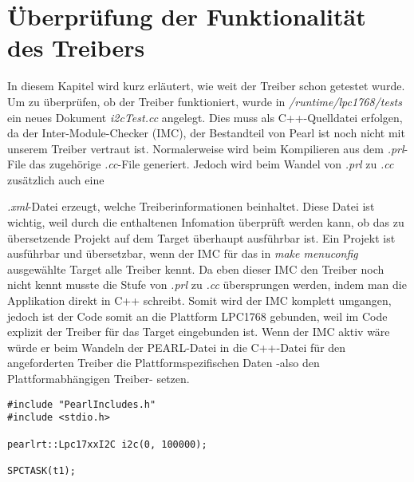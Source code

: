 \section{Überprüfung der Funktionalität des Treibers}
In diesem Kapitel wird kurz erläutert, wie weit der Treiber schon getestet wurde.
Um zu überprüfen, ob der Treiber funktioniert, wurde in {\textit{/runtime/lpc1768/tests}} ein neues Dokument {\textit{i2cTest.cc}} angelegt. Dies muss als C++-Quelldatei erfolgen, da der Inter-Module-Checker (IMC), der Bestandteil von Pearl ist noch nicht mit unserem Treiber vertraut ist. 
Normalerweise wird beim Kompilieren aus dem {\textit{.prl}}-File das zugehörige {\textit{.cc}}-File generiert. Jedoch wird beim Wandel von {\textit{.prl}} zu {\textit{.cc}} zusätzlich auch eine {\textit{.xml}-Datei erzeugt, welche Treiberinformationen beinhaltet. Diese Datei ist wichtig, weil durch die enthaltenen Infomation überprüft werden kann, ob das zu übersetzende Projekt auf dem Target überhaupt ausführbar ist. Ein Projekt ist ausführbar und übersetzbar, wenn der IMC für das in {\textit{make menuconfig}} ausgewählte Target alle Treiber kennt. Da eben dieser IMC den Treiber noch nicht kennt musste die Stufe von {\textit{.prl}} zu {\textit{.cc}} übersprungen werden, indem man die Applikation direkt in C++ schreibt. Somit wird der IMC komplett umgangen, jedoch ist der Code somit an die Plattform LPC1768 gebunden, weil im Code explizit der Treiber für das Target eingebunden ist. Wenn der IMC aktiv wäre würde er beim Wandeln der PEARL-Datei in die C++-Datei für den angeforderten Treiber die Plattformspezifischen Daten -also den Plattformabhängigen Treiber- setzen. 
\begin{lstlisting}
#include "PearlIncludes.h"
#include <stdio.h>

pearlrt::Lpc17xxI2C i2c(0, 100000);

SPCTASK(t1);


\end{lstlisting}}
